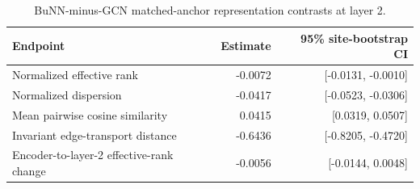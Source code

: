 \begin{table}[H]
\centering
\caption{BuNN-minus-GCN matched-anchor representation contrasts at layer 2.}
\label{tab:supp-representation}
\footnotesize
\begin{tabularx}{\textwidth}{Xrr}
\toprule
Endpoint & Estimate & 95\% site-bootstrap CI \\
\midrule
Normalized effective rank & -0.0072 & [-0.0131, -0.0010] \\
Normalized dispersion & -0.0417 & [-0.0523, -0.0306] \\
Mean pairwise cosine similarity & 0.0415 & [0.0319, 0.0507] \\
Invariant edge-transport distance & -0.6436 & [-0.8205, -0.4720] \\
Encoder-to-layer-2 effective-rank change & -0.0056 & [-0.0144, 0.0048] \\
\bottomrule
\end{tabularx}
\end{table}
